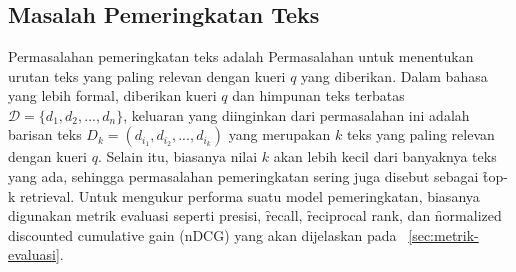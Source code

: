 \chapter{\babDua}
\label{bab:2}


\section{Masalah Pemeringkatan Teks}
    Permasalahan pemeringkatan teks adalah Permasalahan untuk menentukan urutan teks yang paling relevan dengan kueri $q$ yang diberikan. Dalam bahasa yang lebih formal, diberikan kueri $q$ dan himpunan teks terbatas $\mathcal{D}= \{d_1, d_2, ..., d_n\}$, keluaran yang diinginkan dari permasalahan ini adalah barisan teks $D_k = (d_{i_1}, d_{i_2}, ..., d_{i_k})$ yang merupakan $k$ teks yang paling relevan dengan kueri $q$. Selain itu, biasanya nilai $k$ akan lebih kecil dari banyaknya teks yang ada, sehingga permasalahan pemeringkatan sering juga disebut sebagai \f{top-k retrieval}. Untuk mengukur performa suatu model pemeringkatan, biasanya digunakan metrik evaluasi seperti presisi, \f{recall}, \f{reciprocal rank}, dan \f{normalized discounted cumulative gain} (nDCG) yang akan dijelaskan pada \sect~\ref{sec:metrik-evaluasi}.


